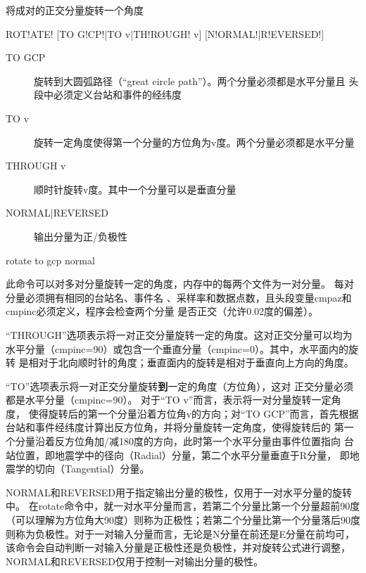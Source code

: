 \label{cmd:rotate}

将成对的正交分量旋转一个角度

\begin{SACSTX}
ROT!ATE! [TO G!CP!|TO v|TH!ROUGH! v] [N!ORMAL!|R!EVERSED!]
\end{SACSTX}

\begin{description}
\item [TO GCP] 旋转到大圆弧路径（``great circle path''）。两个分量必须都是水平分量且
    头段中必须定义台站和事件的经纬度
\item [TO v] 旋转一定角度使得第一个分量的方位角为v度。两个分量必须都是水平分量 
\item [THROUGH v] 顺时针旋转v度。其中一个分量可以是垂直分量
\item [NORMAL|REVERSED] 输出分量为正/负极性 
\end{description}

\begin{SACDFT}
rotate to gcp normal
\end{SACDFT}

此命令可以对多对分量旋转一定的角度，内存中的每两个文件为一对分量。
每对分量必须拥有相同的台站名、事件名
、采样率和数据点数，且头段变量cmpaz和cmpinc必须定义，程序会检查两个分量
是否正交（允许0.02度的偏差）。

``THROUGH''选项表示将一对正交分量旋转一定的角度。这对正交分量可以均为
水平分量（cmpinc=90）或包含一个垂直分量（cmpinc=0）。其中，水平面内的旋转
是相对于北向顺时针的角度；垂直面内的旋转是相对于垂直向上方向的角度。

``TO''选项表示将一对正交分量旋转\textbf{到}一定的角度（方位角），这对
正交分量必须都是水平分量（cmpinc=90）。
对于``TO v''而言，表示将一对分量旋转一定角度，
使得旋转后的第一个分量沿着方位角v的方向；对``TO GCP''而言，首先根据
台站和事件经纬度计算出反方位角，并将分量旋转一定角度，使得旋转后的
第一个分量沿着反方位角加/减180度的方向，此时第一个水平分量由事件位置指向
台站位置，即地震学中的径向（Radial）分量，第二个水平分量垂直于R分量，
即地震学的切向（Tangential）分量。

NORMAL和REVERSED用于指定输出分量的极性，仅用于一对水平分量的旋转中。
在rotate命令中，就一对水平分量而言，若第二个分量比第一个分量超前90度
（可以理解为方位角大90度）则称为正极性；若第二个分量比第一个分量落后90度
则称为负极性。对于一对输入分量而言，无论是N分量在前还是E分量在前均可，
该命令会自动判断一对输入分量是正极性还是负极性，并对旋转公式进行调整，
NORMAL和REVERSED仅用于控制一对输出分量的极性。


